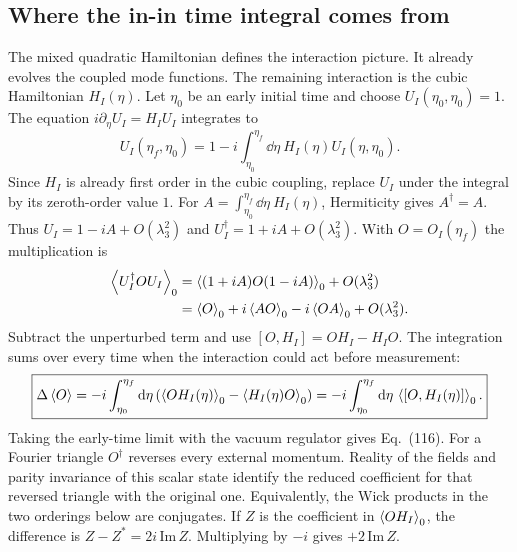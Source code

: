 \clearpage
\subsection{Where the in-in time integral comes from}
The mixed quadratic Hamiltonian defines the interaction picture. It already evolves the coupled mode functions. The remaining interaction is the cubic Hamiltonian $H_I(\eta)$. Let $\eta_0$ be an early initial time and choose $U_I(\eta_0,\eta_0)=1$. The equation $i\partial_{\eta}U_I=H_I U_I$ integrates to
\begin{equation}
 U_I(\eta_f,\eta_0)=1-i\int_{\eta_0}^{\eta_f}\dd\eta\ H_I(\eta)U_I(\eta,\eta_0).
\end{equation}
Since $H_I$ is already first order in the cubic coupling, replace $U_I$ under the integral by its zeroth-order value $1$. For $A=\int_{\eta_0}^{\eta_f}\dd\eta\ H_I(\eta)$, Hermiticity gives $A^\dagger=A$. Thus $U_I=1-iA+O(\lambda_3^2)$ and $U_I^\dagger=1+iA+O(\lambda_3^2)$. With $O=O_I(\eta_f)$ the multiplication is
\begin{align}
\left\langle U_I^\dagger O U_I\right\rangle_0
 &=\left\langle (1+iA)O(1-iA)\right\rangle_0+O(\lambda_3^2)\nonumber\\
 &=\left\langle O\right\rangle_0+i\left\langle AO\right\rangle_0-i\left\langle OA\right\rangle_0+O(\lambda_3^2).
\end{align}
Subtract the unperturbed term and use $[O,H_I]=OH_I-H_IO$. The integration sums over every time when the interaction could act before measurement:
\begin{equation}\boxed{\displaystyle
\Delta\left\langle O\right\rangle=-i\int_{\eta_0}^{\eta_f}\mathrm d\eta\left(\left\langle O H_I(\eta)\right\rangle_0-\left\langle H_I(\eta)O\right\rangle_0\right)
=-i\int_{\eta_0}^{\eta_f}\mathrm d\eta\,\left\langle [O,H_I(\eta)]\right\rangle_0 .}
\end{equation}
Taking the early-time limit with the vacuum regulator gives Eq.~(116). For a Fourier triangle $O^\dagger$ reverses every external momentum. Reality of the fields and parity invariance of this scalar state identify the reduced coefficient for that reversed triangle with the original one. Equivalently, the Wick products in the two orderings below are conjugates. If $Z$ is the coefficient in $\left\langle O H_I\right\rangle_0$, the difference is $Z-Z^*=2i\,\mathrm{Im}\,Z$. Multiplying by $-i$ gives $+2\,\mathrm{Im}\,Z$.

